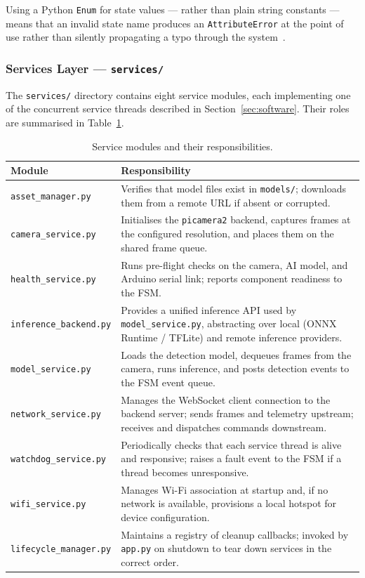 Using a Python \texttt{Enum} for state values — rather than plain
string constants — means that an invalid state name produces an
\texttt{AttributeError} at the point of use rather than silently
propagating a typo through the system~\cite{martin2008clean}.
 
\subsubsection{Services Layer — \texttt{services/}}
 
The \texttt{services/} directory contains eight service modules, each
implementing one of the concurrent service threads described in
Section~\ref{sec:software}. Their roles are summarised in
Table~\ref{tab:services}.
 
\begin{table}[h]
\centering
\caption{Service modules and their responsibilities.}
\label{tab:services}
\begin{tabular}{p{4cm} p{8cm}}
\hline
\textbf{Module} & \textbf{Responsibility} \\
\hline
\texttt{asset\_manager.py}   & Verifies that model files exist in \texttt{models/}; downloads them from a remote URL if absent or corrupted. \\
\texttt{camera\_service.py}  & Initialises the \texttt{picamera2} backend, captures frames at the configured resolution, and places them on the shared frame queue. \\
\texttt{health\_service.py}  & Runs pre-flight checks on the camera, AI model, and Arduino serial link; reports component readiness to the FSM. \\
\texttt{inference\_backend.py} & Provides a unified inference API used by \texttt{model\_service.py}, abstracting over local (ONNX Runtime / TFLite) and remote inference providers. \\
\texttt{model\_service.py}   & Loads the detection model, dequeues frames from the camera, runs inference, and posts detection events to the FSM event queue. \\
\texttt{network\_service.py} & Manages the WebSocket client connection to the backend server; sends frames and telemetry upstream; receives and dispatches commands downstream. \\
\texttt{watchdog\_service.py} & Periodically checks that each service thread is alive and responsive; raises a fault event to the FSM if a thread becomes unresponsive. \\
\texttt{wifi\_service.py}    & Manages Wi-Fi association at startup and, if no network is available, provisions a local hotspot for device configuration. \\
\texttt{lifecycle\_manager.py} & Maintains a registry of cleanup callbacks; invoked by \texttt{app.py} on shutdown to tear down services in the correct order. \\
\hline
\end{tabular}
\end{table}
 
